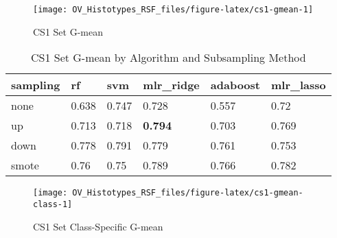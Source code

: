\documentclass[
]{report}
\begin{document}
\begin{figure}[H]

{\centering \texttt{[image: OV\_Histotypes\_RSF\_files/figure-latex/cs1-gmean-1]} 

}

\caption{CS1 Set G-mean}\label{fig:cs1-gmean}
\end{figure}

\begin{table}

\caption{\label{tab:cs1-gmean-table}CS1 Set G-mean by Algorithm and Subsampling Method}
\centering
\begin{tabular}[t]{l|l|l|l|l|l}
\hline
sampling & rf & svm & mlr\_ridge & adaboost & mlr\_lasso\\
\hline
none & 0.638 & 0.747 & 0.728 & 0.557 & 0.72\\
\hline
up & 0.713 & 0.718 & \textbf{0.794} & 0.703 & 0.769\\
\hline
down & 0.778 & 0.791 & 0.779 & 0.761 & 0.753\\
\hline
smote & 0.76 & 0.75 & 0.789 & 0.766 & 0.782\\
\hline
\end{tabular}
\end{table}

\begin{figure}[H]

{\centering \texttt{[image: OV\_Histotypes\_RSF\_files/figure-latex/cs1-gmean-class-1]} 

}

\caption{CS1 Set Class-Specific G-mean}\label{fig:cs1-gmean-class}
\end{figure}
\end{document}
